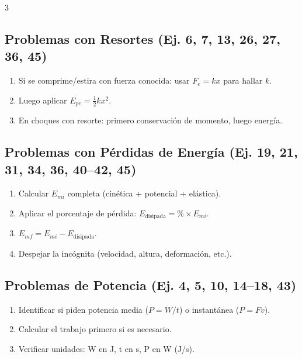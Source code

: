 \documentclass[10pt,landscape]{article}
\begin{document}
\begin{multicols}{3}
\subsection*{Problemas con Resortes (Ej. 6, 7, 13, 26, 27, 36, 45)}
\begin{enumerate}[leftmargin=*,nosep,topsep=0pt]
  \item Si se comprime/estira con fuerza conocida: usar $F_e = kx$ para hallar $k$.
  \item Luego aplicar $E_{pe} = \frac{1}{2}kx^2$.
  \item En choques con resorte: primero conservaci\'{o}n de momento, luego energ\'{i}a.
\end{enumerate}

\subsection*{Problemas con P\'{e}rdidas de Energ\'{i}a (Ej. 19, 21, 31, 34, 36, 40--42, 45)}
\begin{enumerate}[leftmargin=*,nosep,topsep=0pt]
  \item Calcular $E_{mi}$ completa (cin\'{e}tica + potencial + el\'{a}stica).
  \item Aplicar el porcentaje de p\'{e}rdida: $E_{\text{disipada}} = \% \times E_{mi}$.
  \item $E_{mf} = E_{mi} - E_{\text{disipada}}$.
  \item Despejar la inc\'{o}gnita (velocidad, altura, deformaci\'{o}n, etc.).
\end{enumerate}

\subsection*{Problemas de Potencia (Ej. 4, 5, 10, 14--18, 43)}
\begin{enumerate}[leftmargin=*,nosep,topsep=0pt]
  \item Identificar si piden potencia media ($P = W/t$) o instant\'{a}nea ($P = Fv$).
  \item Calcular el trabajo primero si es necesario.
  \item Verificar unidades: W en J, t en s, P en W (J/s).
\end{enumerate}

\vspace{4pt}


\end{multicols}
\end{document}
